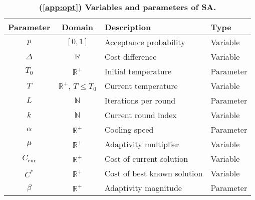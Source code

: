 \begin{table}[h]
\setlength{\tabcolsep}{5pt}
\centering
\captionsetup{justification=centering}
\begin{tabular}{ccll}
\toprule
Parameter		& Domain						& Description					& Type
\vspace{-0.3em}\\
\midrule
$p$				& $[0,1]$						& Acceptance probability		& Variable	\\
$\Delta$		& $\mathbb{R}$					& Cost difference				& Variable	\\
$T_0$			& $\mathbb{R^+}$				& Initial temperature			& Parameter	\\
$T$				& $\mathbb{R^+}$, $T \leq T_0$	& Current temperature			& Variable	\\
$L$				& $\mathbb{N}$					& Iterations per round			& Parameter	\\
$k$				& $\mathbb{N}$					& Current round index			& Variable	\\
$\alpha$		& $\mathbb{R^+}$				& Cooling speed					& Parameter	\\
$\mu$			& $\mathbb{R^+}$				& Adaptivity multiplier			& Variable	\\
$C_\text{cur}$	& $\mathbb{R^+}$				& Cost of current solution		& Variable	\\
$C^*$			& $\mathbb{R^+}$				& Cost of best known solution	& Variable	\\
$\beta$			& $\mathbb{R^+}$				& Adaptivity magnitude			& Parameter	\\
\bottomrule
\end{tabular}
\caption{\textbf{(\textsection \ref{app:opt}) Variables and parameters of SA.}}
\label{tab:back-sa}
\end{table}

